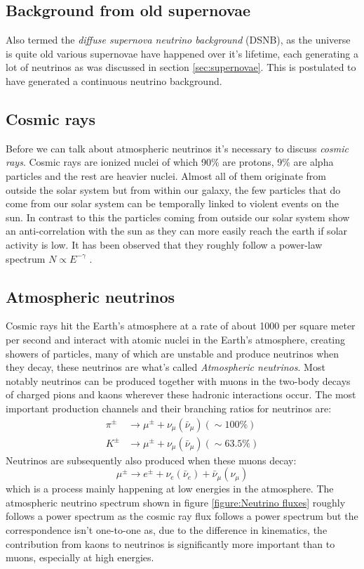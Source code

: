 \documentclass[11pt,a4paper,faculty=we,language=en,doctype=report]{cls/ugent-doc}
\begin{document}
\subsection{Background from old supernovae}
Also termed the \textit{diffuse supernova neutrino background} (DSNB), as the
universe is quite old various supernovae have happened over it's lifetime, each generating
a lot of neutrinos as was discussed in section \ref{sec:supernovae}. 
This is postulated to have generated a continuous neutrino background.
\subsection{Cosmic rays}
Before we can talk about atmospheric neutrinos it's necessary to discuss \textit{cosmic rays}.
Cosmic rays are ionized nuclei of which 90\% are protons, 9\% are alpha particles and
the rest are heavier nuclei. Almost all of them originate from outside the solar system but
from within our galaxy, the few particles that do come from our solar system can be temporally
linked to violent events on the sun. In contrast to this the particles coming from outside
our solar system show an anti-correlation with the sun as they can more easily reach the earth
if solar activity is low.
It has been observed that they roughly follow a power-law spectrum 
$N \propto E^{-\gamma}$ \cite{gaisser_engel_resconi_2016}.
\subsection{Atmospheric neutrinos}
\label{sec:AtmosphericNeutrinos}
Cosmic rays hit the Earth's atmosphere at a rate of about 1000 per square meter
per second and interact with atomic nuclei in the Earth's atmosphere, creating
showers of particles, many of which are unstable and produce neutrinos when
they decay, these neutrinos are what's called \textit{Atmospheric neutrinos}.
Most notably neutrinos can be produced together with muons in the two-body
decays of charged pions and kaons wherever these hadronic interactions occur.
The most important production channels and their branching ratios for neutrinos
are:
\begin{align}
	\pi^\pm &\rightarrow \mu^\pm + \nu_\mu(\bar{\nu}_\mu) (\sim 100\%)\\
	K^\pm &\rightarrow \mu^\pm + \nu_\mu(\bar{\nu}_\mu) (\sim 63.5\%)
\end{align}
Neutrinos are subsequently also produced when these muons decay:
\begin{equation}
	\mu^\pm \rightarrow e^\pm + \nu_e(\bar{\nu}_e) + \bar{\nu}_\mu(\nu_\mu)
\end{equation}
which is a process mainly happening at low energies in the atmosphere.  The
atmospheric neutrino spectrum shown in figure \ref{figure:Neutrino
fluxes} roughly follows a power spectrum as the cosmic ray flux follows a power
spectrum but the correspondence isn't one-to-one as, due to the difference in
kinematics, the contribution from kaons to neutrinos is significantly more
important than to muons, especially at high energies.
\end{document}
